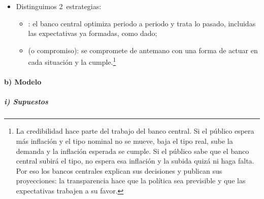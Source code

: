 \documentclass[11pt]{article}
\begin{document}
\begin{itemize}
\item Distinguimos 2~estrategias:
  \begin{itemize}
  \item {}: el banco central optimiza periodo a periodo y trata lo pasado, incluidas las expectativas ya formadas, como dado;
  \item {} (o compromiso): se compromete de antemano con una forma de actuar en cada situación y la cumple.\footnote{La credibilidad hace parte del trabajo del banco central. Si el público espera más inflación y el tipo nominal no se mueve, baja el tipo real, sube la demanda y la inflación esperada se cumple. Si el público sabe que el banco central subirá el tipo, no espera esa inflación y la subida quizá ni haga falta. Por eso los bancos centrales explican sus decisiones y publican sus proyecciones: la transparencia hace que la política sea previsible y que las expectativas trabajen a su favor\nocite{Woodford2003Interest}.}
  \end{itemize}
\end{itemize}

\paragraph{b) Modelo}

\subparagraph{i) Supuestos}
\end{document}

